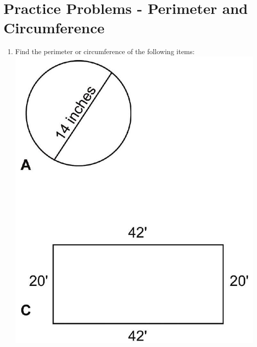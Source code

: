 \documentclass[10pt]{article}
\begin{document}
\section{Practice Problems - Perimeter and Circumference}
\begin{enumerate}
  \item Find the perimeter or circumference of the following items:\\

\includegraphics[max width=\textwidth]{2022_09_11_72dbedc910e6e984560cg-26}
\end{enumerate}
\end{document}
